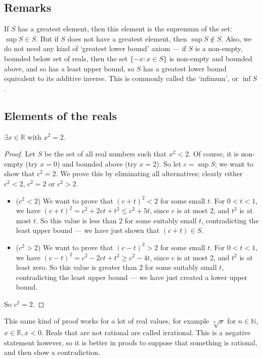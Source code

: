 \subsection{Remarks}
If \(S\) has a greatest element, then this element is the supremum of the set: \(\sup S \in S\).
But if \(S\) does not have a greatest element, then \(\sup S \notin S\).
Also, we do not need any kind of `greatest lower bound' axiom --- if \(S\) is a non-empty, bounded below set of reals, then the set \(\{ -x: x \in S \}\) is non-empty and bounded above, and so has a least upper bound, so \(S\) has a greatest lower bound equivalent to its additive inverse.
This is commonly called the `infimum', or \(\inf S\).

\subsection{Elements of the reals}
\begin{theorem}
	\(\exists x \in \mathbb R\) with \(x^2 = 2\).
\end{theorem}
\begin{proof}
	Let \(S\) be the set of all real numbers such that \(x^2 < 2\).
	Of course, it is non-empty (try \(x=0\)) and bounded above (try \(x=2\)).
	So let \(c = \sup S\); we want to show that \(c^2 = 2\).
	We prove this by eliminating all alternatives; clearly either \(c^2 < 2\), \(c^2 = 2\) or \(c^2 > 2\).
	\begin{itemize}
		\item (\(c^2 < 2\)) We want to prove that \((c+t)^2 < 2\) for some small \(t\).
		      For \(0<t<1\), we have \((c+t)^2 = c^2 + 2ct + t^2 \leq c^2 + 5t\), since \(c\) is at most 2, and \(t^2\) is at most \(t\).
		      So this value is less than 2 for some suitably small \(t\), contradicting the least upper bound --- we have just shown that \((c+t) \in S\).
		\item (\(c^2 > 2\)) We want to prove that \((c-t)^2 > 2\) for some small \(t\).
		      For \(0<t<1\), we have \((c-t)^2 = c^2 - 2ct + t^2 \geq c^2 - 4t\), since \(c\) is at most 2, and \(t^2\) is at least zero.
		      So this value is greater than 2 for some suitably small \(t\), contradicting the least upper bound --- we have just created a lower upper bound.
	\end{itemize}
	So \(c^2 = 2\).
\end{proof}
This same kind of proof works for a lot of real values, for example \(\sqrt[n]{x}\) for \(n \in \mathbb N\), \(x\in \mathbb R, x < 0\).
Reals that are not rational are called irrational.
This is a negative statement however, so it is better in proofs to suppose that something is rational, and then show a contradiction.

